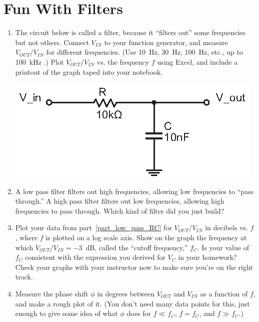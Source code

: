 \section{Fun With Filters}
\label{lab_filters}


\bigskip

\begin{enumerate}[wide]

\item The circuit below is called a filter, because it ``filters out'' some frequencies but not others.  Connect $V_{IN}$ to your function generator, and measure $V_{OUT}/V_{IN}$ for different frequencies.  (Use 10~Hz, 30~Hz, 100~Hz, etc., up to 100~kHz .)  Plot $V_{OUT}/V_{IN}$ vs. the frequency $f$ using Excel, and include a printout of the graph taped into your notebook.  \label{part_low_pass_RC}
\begin{center}
\includegraphics{filters/low_pass_filter_RC.eps}
\end{center}

\item A low pass filter filters out high frequencies, allowing low frequencies to ``pass through.''  A high pass filter filters out low frequencies, allowing high frequencies to pass through.  Which kind of filter did you just build?  

\item Plot your data from part~\ref{part_low_pass_RC} for $V_{OUT}/V_{IN}$ in decibels vs. $f$, where $f$ is plotted on a log scale axis.  Show on the graph the frequency at which $V_{OUT}/V_{IN}=-3$~dB, called the ``cutoff frequency,'' $f_C$.  Is your value of $f_C$ consistent with the expression you derived for $V_C$ in your homework?  Check your graphs with your instructor now to make sure you're on the right track.\label{part_low_pass_log_plot}

\item Measure the phase shift $\phi$ in degrees between $V_{OUT}$ and $V_{IN}$ as a function of $f$, and make a rough plot of it.  (You don't need many data points for this, just enough to give some idea of what $\phi$ does for $f \ll f_C$, $f = f_C$, and $f \gg f_C$.)


\end{enumerate}
